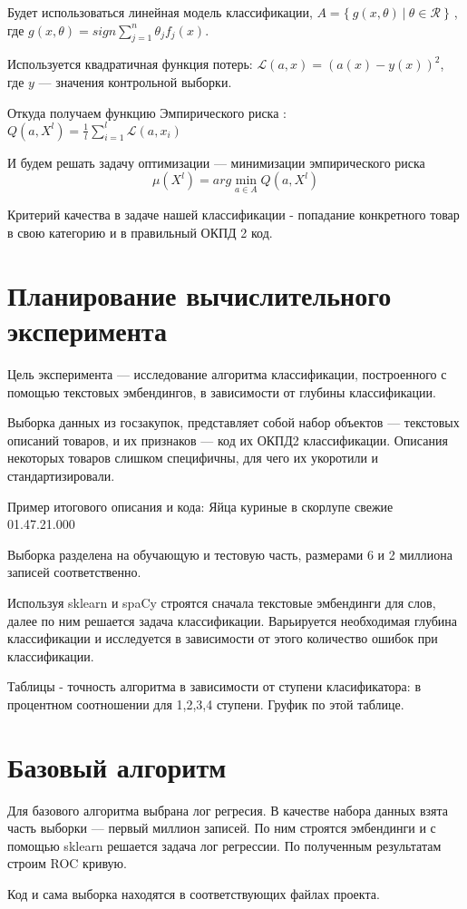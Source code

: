 \documentclass{article}
\begin{document}
Будет использоваться линейная модель классификации, $A = \{ \ g(x,\theta) \ | \ \theta \in \mathcal{R} \ \}$ , где $g(x, \theta) = sign \sum \limits_{j=1}^n \theta_j f_j(x)$.

Используется квадратичная функция потерь: $\mathcal{L}(a,x) = (a(x) - y(x))^2$, где $y$ --- значения контрольной выборки.  

Откуда получаем функцию Эмпирического риска : $Q(a,X^l)=\frac{1}{l}\sum\limits^l_{i=1}\mathcal{L}(a,x_i)$

И будем решать задачу оптимизации --- минимизации эмпирического риска 
$$ \mu(X^l) = arg \min_{a\in A} Q(a, X^l)$$


Критерий качества в задаче нашей классификации - попадание конкретного товар в свою категорию и в правильный ОКПД 2 код.


\section{Планирование вычислительного эксперимента}

Цель эксперимента --- исследование алгоритма классификации, построенного с помощью текстовых эмбендингов, в зависимости от глубины классификации.

Выборка данных из госзакупок, представляет собой набор объектов --- текстовых описаний товаров, и их признаков --- код их ОКПД2 классификации. Описания некоторых товаров слишком специфичны, для чего их укоротили и стандартизировали. %

Пример итогового описания и кода: Яйца куриные в скорлупе свежие	01.47.21.000  

Выборка разделена на обучающую и тестовую часть, размерами 6 и 2 миллиона записей соответственно.  

Используя sklearn и spaCy строятся сначала текстовые эмбендинги для слов, далее по ним решается задача классификации. Варьируется необходимая глубина классификации и исследуется в зависимости от этого количество ошибок при классификации.

Таблицы - точность алгоритма в зависимости от ступени класификатора: 
в процентном соотношении для 1,2,3,4 ступени.
Груфик по этой таблице.

\section{Базовый алгоритм}
Для базового алгоритма выбрана лог регресия.  
В качестве набора данных взята часть выборки --- первый миллион записей. По ним строятся эмбендинги и с помощью sklearn решается задача лог регрессии. По полученным результатам строим ROC кривую.

Код и сама выборка находятся в соответствующих файлах проекта.





\end{document}
